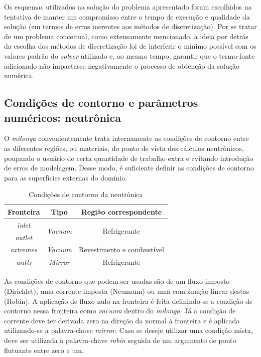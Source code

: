 Os esquemas utilizados na solução do problema apresentado foram escolhidos na tentativa de manter
um compromisso entre o tempo de execução e qualidade da solução (em termos de erros inerentes
aos métodos de discretização). Por se tratar de um problema conceitual, como extensamente mencionado,
a ideia por detrás da escolha dos métodos de discretização foi de interferir o mínimo possível com
os valores padrão do \textit{solver} utilizado e, ao mesmo tempo, garantir que o termo-fonte
adicionado não impactasse negativamente o processo de obtenção da solução numérica.


\subsection{Condições de contorno e parâmetros numéricos: neutrônica}
\label{ssec:neutro}

O \textit{milonga} convenientemente trata internamente as condições de contorno
entre as diferentes regiões, ou materiais, do ponto de vista dos cálculos neutrônicos,
poupando o usuário de certa quantidade de trabalho extra e evitando introdução
de erros de modelagem. Desse modo, é suficiente definir as condições de contorno
para as superfícies externas do domínio.

\begin{table}[htb]
  \centering
\caption{Condições de contorno da neutrônica}
\label{tab:cc-neut}
\begin{tabular}{ccc}
Fronteira         & Tipo                             & Região correspondente         \\ \hline
\textit{inlet}    & \multirow{2}{*}{\textit{Vacuum}} & \multirow{2}{*}{Refrigerante} \\
\textit{outlet}   &                                  &                               \\ \cline{1-1}
\textit{extremes} & \textit{Vacuum}                  & Revestimento e combustível    \\ \hline
\textit{walls}    & \textit{Mirror}                  & Refrigerante                 
\end{tabular}
\end{table}

As condições de contorno que podem ser usadas são de um fluxo imposto (Dirichlet),
uma corrente imposta (Neumann) ou uma combinação linear destas (Robin). A aplicação
de fluxo nulo na fronteira é feita definindo-se a condição de contorno nessa fronteira
como 
\textit{vacuum} dentro do \textit{milonga}. Já a condição
de corrente deve ter derivada zero na direção da normal à fronteira e é aplicada
utilizando-se a palavra-chave \textit{mirror}. Caso se deseje utilizar uma condição mista, deve
ser utilizada a palavra-chave \textit{robin} seguida de um argumento de ponto
flutuante entre zero e um.

